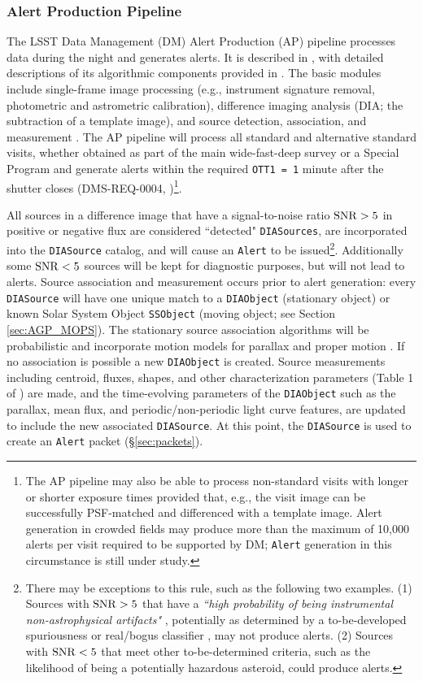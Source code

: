 \subsubsection{Alert Production Pipeline}\label{sec:AP}

The LSST Data Management (DM) Alert Production (AP) pipeline processes data during the night and generates alerts.
It is described in , with detailed descriptions of its algorithmic components provided in .
The basic modules include single-frame image processing (e.g., instrument signature removal, photometric and astrometric calibration), difference imaging analysis (DIA; the subtraction of a template image), and source detection, association, and measurement .
The AP pipeline will process all standard and alternative standard visits, whether obtained as part of the main wide-fast-deep survey or a Special Program  and generate alerts within the required {\tt OTT1 = 1} minute after the shutter closes (DMS-REQ-0004, )\footnote{
The AP pipeline may also be able to process non-standard visits with longer or shorter exposure times provided that, e.g., the visit image can be successfully PSF-matched and differenced with a template image.
Alert generation in crowded fields may produce more than the maximum of 10,000 alerts per visit required to be supported by DM; \texttt{Alert} generation in this circumstance is still under study.
}.

All sources in a difference image that have a signal-to-noise ratio ${\rm SNR}>5$ in positive or negative flux are considered ``detected" \texttt{DIASources}, are incorporated into the {\tt DIASource} catalog, and will cause an {\tt Alert} to be issued\footnote{
There may be exceptions to this rule, such as the following two examples.
(1) Sources with ${\rm SNR} > 5$ that have a {\it ``high probability of being instrumental non-astrophysical artifacts"} , potentially as determined by 
a to-be-developed spuriousness or real/bogus classifier , may not produce alerts.
(2) Sources with ${\rm SNR} < 5$ that meet other to-be-determined criteria, such as the likelihood of being a potentially hazardous asteroid, could produce alerts.}.
Additionally some ${\rm SNR} < 5$ sources will be kept for diagnostic purposes, but will not lead to alerts.
Source association and measurement occurs prior to alert generation: every {\tt DIASource} will have one unique match to a {\tt DIAObject} (stationary object) or known Solar System Object {\tt SSObject} (moving object; see Section \ref{sec:AGP_MOPS}).
The stationary source association algorithms will be probabilistic and incorporate motion models for parallax and proper motion .
If no association is possible a new {\tt DIAObject} is created.
Source measurements including centroid, fluxes, shapes, and other characterization parameters (Table 1 of ) are made, and the time-evolving parameters of the {\tt DIAObject} such as the parallax, mean flux, and periodic/non-periodic light curve features, are updated to include the new associated {\tt DIASource}.
At this point, the {\tt DIASource} is used to create an {\tt Alert} packet (\S \ref{sec:packets}).


